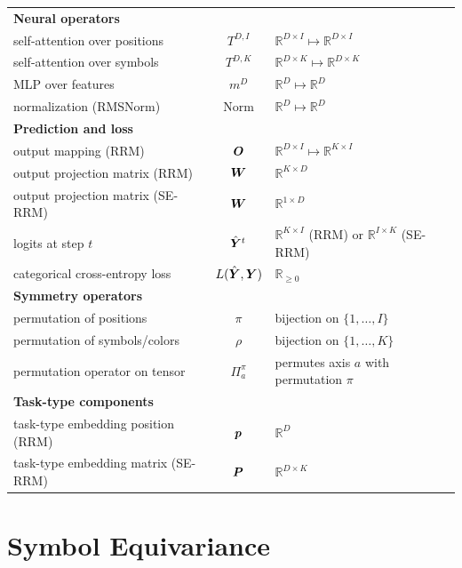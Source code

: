 \documentclass{article}
\theoremstyle{plain}
\theoremstyle{definition}
\theoremstyle{remark}
\begin{document}
\begin{table}[H]
{\begin{tabular}{l c l}
\midrule
\multicolumn{3}{l}{\textbf{Neural operators}} \\
self-attention over positions & $T^{D,I}$ & $\mathbb{R}^{D \times I} \mapsto \mathbb{R}^{D \times I}$ \\
self-attention over symbols & $T^{D,K}$ & $\mathbb{R}^{D \times K} \mapsto \mathbb{R}^{D \times K}$ \\
MLP over features & $m^{D}$ & $\mathbb{R}^{D} \mapsto \mathbb{R}^{D}$ \\
normalization (RMSNorm) & $\mathrm{Norm}$ & $\mathbb{R}^{D} \mapsto \mathbb{R}^{D}$  \\

\midrule
\multicolumn{3}{l}{\textbf{Prediction and loss}} \\
output mapping (RRM) & $\bm{O}$ & $\mathbb{R}^{D \times I} \mapsto \mathbb{R}^{K \times I}$ \\
output projection matrix (RRM) & $\bm{W}$ & $\mathbb{R}^{K \times D}$ \\
output projection matrix (SE-RRM) & $\bm{W}$ & $\mathbb{R}^{1 \times D}$ \\
logits at step $t$ & $\hat{\bm{Y}}^t$ & $\mathbb{R}^{K \times I}$ (RRM) or $\mathbb{R}^{I \times K}$ (SE-RRM) \\
categorical cross-entropy loss & $L(\hat{\bm{Y}}, \bm{Y})$ & $\mathbb{R}_{\ge 0}$ \\

\midrule
\multicolumn{3}{l}{\textbf{Symmetry operators}} \\
permutation of positions & $\pi$ & bijection on $\{1,\ldots,I\}$ \\
permutation of symbols/colors & $\rho$ & bijection on $\{1,\ldots,K\}$ \\
permutation operator on tensor & $\Pi_a^\pi$ & permutes axis $a$ with permutation $\pi$ \\

\midrule
\multicolumn{3}{l}{\textbf{Task-type components}} \\
task-type embedding position (RRM) & $\bm{p}$ & $\mathbb{R}^{D}$ \\
task-type embedding matrix (SE-RRM) & $\bm{P}$ & $\mathbb{R}^{D \times K}$ \\

\end{tabular}
}
\end{table}



\section{Symbol Equivariance}
\end{document}
